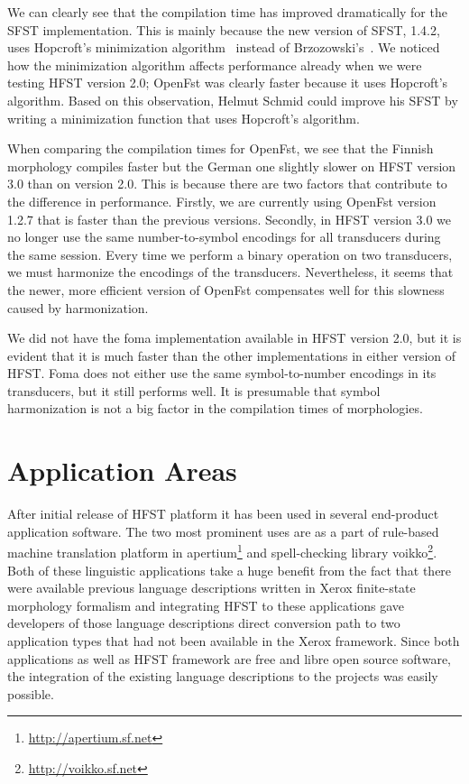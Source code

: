 \documentclass{llncs}
\begin{document}
We can clearly see that the compilation time has improved dramatically
for the SFST implementation.
This is mainly because the new version of SFST, 1.4.2, uses Hopcroft's
minimization algorithm~\cite{hopcroft/1971} instead of 
Brzozowski's~\cite{brzozowski/1964}. 
We noticed how the minimization algorithm affects performance
already when we were testing HFST version 2.0; 
OpenFst was clearly faster because it uses Hopcroft's algorithm. 
Based on this observation, Helmut Schmid could improve his SFST by 
writing a minimization function that uses Hopcroft's algorithm.

When comparing the compilation times for OpenFst, we see that the
Finnish morphology compiles faster but the German one slightly slower
on HFST version 3.0 than on version 2.0. This is because there are two
factors that contribute to the difference in performance. Firstly, we
are currently using OpenFst version 1.2.7 that is faster than the
previous versions. Secondly, in HFST version 3.0 we no longer use the
same number-to-symbol encodings for all transducers during the same
session. Every time we perform a binary operation on two transducers,
we must harmonize the encodings of the transducers. Nevertheless, 
it seems that the newer, more efficient version of
OpenFst compensates well for this slowness caused by harmonization. 

We did not have the foma implementation available in HFST version 2.0,
but it is evident that it is much faster than the other
implementations in either version of HFST. Foma does not either use
the same symbol-to-number encodings in its transducers, but it still
performs well. It is presumable that symbol harmonization is not a big
factor in the compilation times of morphologies. 


\section{Application Areas}

After initial release of HFST platform it has been used in several end-product
application software. The two most prominent uses are as a part of rule-based
machine translation platform in apertium\footnote{\url{http://apertium.sf.net}}
and spell-checking library voikko\footnote{\url{http://voikko.sf.net}}. Both of
these linguistic applications take a huge benefit from the fact that there
were available previous language descriptions written in Xerox finite-state
morphology formalism and integrating HFST to these applications gave
developers of those language descriptions direct conversion path to two
application types that had not been available in the Xerox framework. Since
both applications as well as HFST framework are free and libre open source
software, the integration of the existing language descriptions to the
projects was easily possible.
\end{document}
